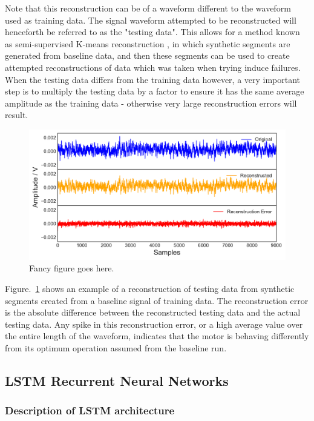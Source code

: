 Note that this reconstruction can be of a waveform different to the waveform used as training data. The signal waveform attempted to be reconstructed will henceforth be referred to as the "testing data". This allows for a method known as semi-supervised K-means reconstruction \cite{596afe3f2b5a4ff3b8f4f9793ad2f4ee}, in which synthetic segments are generated from baseline data, and then these segments can be used to create attempted reconstructions of data which was taken when trying induce failures. When the testing data differs from the training data however, a very important step is to multiply the testing data by a factor to ensure it has the same average amplitude as the training data - otherwise very large reconstruction errors will result.


\begin{figure}[t]
    \includegraphics[width=1.0\textwidth]{fig/kmeans2.pdf}
    \caption[K mean clustering plot]{Fancy figure goes here.}
    \label{fig:kmeanerror}
\end{figure}

Figure.~\ref{fig:kmeanerror} shows an example of a reconstruction of testing data from synthetic segments created from a baseline signal of training data. The reconstruction error is the absolute difference between the reconstructed testing data and the actual testing data. Any spike in this reconstruction error, or a high average value over the entire length of the waveform, indicates that the motor is behaving differently from its optimum operation assumed from the baseline run.

\subsection{LSTM Recurrent Neural Networks}
\label{subsec:LSTM}

\subsubsection{Description of LSTM architecture}

